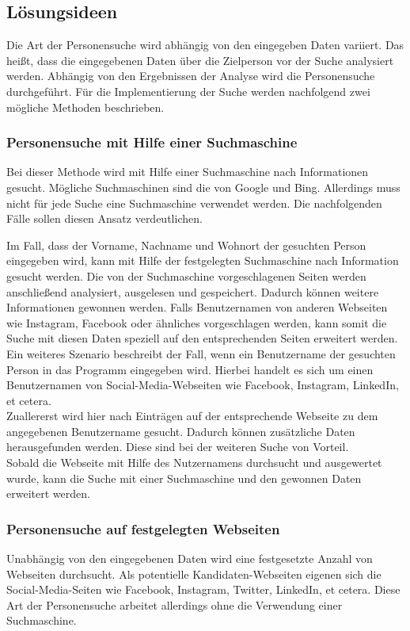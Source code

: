 	\subsection{Lösungsideen}
	\label{sec:Suche nach Information}
	Die Art der Personensuche wird abhängig von den eingegeben Daten variiert. Das heißt, dass die eingegebenen Daten über die Zielperson vor der Suche analysiert werden. Abhängig von den Ergebnissen der Analyse wird die Personensuche durchgeführt. Für die Implementierung der Suche werden nachfolgend zwei mögliche Methoden beschrieben.
	
		\subsubsection{Personensuche mit Hilfe einer Suchmaschine}
		\label{subsubsec:PersonensucheMitHilfevonSuchmaschine}
		Bei dieser Methode wird mit Hilfe einer Suchmaschine nach Informationen gesucht. Mögliche Suchmaschinen sind die von Google und Bing. Allerdings muss nicht für jede Suche eine Suchmaschine verwendet werden. Die nachfolgenden Fälle sollen diesen Ansatz verdeutlichen.
		
		Im Fall, dass der Vorname, Nachname und Wohnort der gesuchten Person eingegeben wird, kann mit Hilfe der festgelegten Suchmaschine nach Information gesucht werden. Die von der Suchmaschine vorgeschlagenen Seiten werden anschließend analysiert, ausgelesen und gespeichert. Dadurch können weitere Informationen gewonnen werden. Falls Benutzernamen von anderen Webseiten wie Instagram, Facebook oder ähnliches vorgeschlagen werden, kann somit die Suche mit diesen Daten speziell auf den entsprechenden Seiten erweitert werden.\\
		Ein weiteres Szenario beschreibt der Fall, wenn ein Benutzername der gesuchten Person in das Programm eingegeben wird. Hierbei handelt es sich um einen Benutzernamen von Social-Media-Webseiten wie Facebook, Instagram, LinkedIn, et cetera. \\
		Zuallererst wird hier nach Einträgen auf der entsprechende Webseite zu dem angegebenen Benutzername gesucht. Dadurch können zusätzliche Daten herausgefunden werden. Diese sind bei der weiteren Suche von Vorteil.\\
		Sobald die Webseite mit Hilfe des Nutzernamens durchsucht und ausgewertet wurde, kann die Suche mit einer Suchmaschine und den gewonnen Daten erweitert werden.
		
		\subsubsection{Personensuche auf festgelegten Webseiten}
		\label{subsubsec:PersonensucheohneSuchmaschine}
		Unabhängig von den eingegebenen Daten wird eine festgesetzte Anzahl von Webseiten durchsucht. Als potentielle Kandidaten-Webseiten eigenen sich die Social-Media-Seiten wie Facebook, Instagram, Twitter, LinkedIn, et cetera. Diese Art der Personensuche arbeitet allerdings ohne die Verwendung einer Suchmaschine.
		
